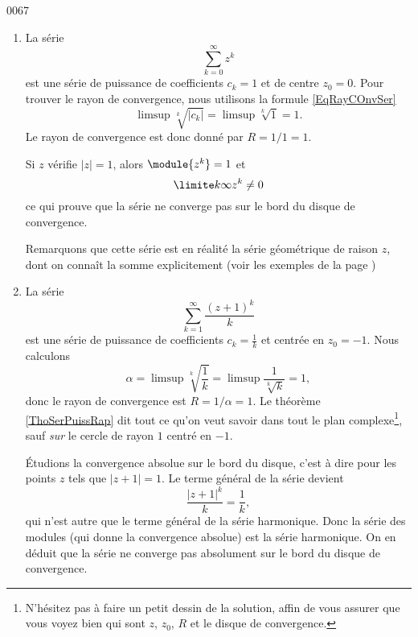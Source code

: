 
\begin{corrige}{0067}

\begin{enumerate}
\item La série
\begin{equation*}
	\sum_{k=0}^\infty z^k
\end{equation*}
est une série de puissance de coefficients $c_k = 1$ et de centre $z_0 = 0$. Pour trouver le rayon de convergence, nous utilisons la formule \eqref{EqRayCOnvSer}
\begin{equation*}
	\limsup\sqrt[k]{| c_k |}=\limsup\sqrt[k]{1}=1.
\end{equation*}
Le rayon de convergence est donc donné par $R = 1/1 = 1$.

Si $z$ vérifie $| z | = 1$, alors $\module{z^k} = 1$ et
\begin{equation*}
	\limite k \infty z^k \neq 0
\end{equation*}
ce qui prouve que la série ne converge pas sur le bord du disque de
convergence.

Remarquons que cette série est en réalité la série géométrique de raison $z$, dont on connaît la somme explicitement (voir les exemples de la page \pageref{exemples:series})

\item La série
\begin{equation*}
	\sum_{k=1}^\infty \frac{{(z+1)}^k}{k}
\end{equation*}
est une série de puissance de coefficients $c_k = \frac{1}{ k }$ et centrée en $z_0 = -1$. Nous calculons
\begin{equation}
	\alpha=\limsup\sqrt[k]{\frac{1}{ k }}=\limsup\frac{1}{ \sqrt[k]{k} }=1,
\end{equation}
donc le rayon de convergence est $R = 1/\alpha = 1$. Le théorème \ref{ThoSerPuissRap} dit tout ce qu'on veut savoir dans tout le plan complexe\footnote{N'hésitez pas à faire un petit dessin de la solution, affin de vous assurer que vous voyez bien qui sont $z$, $z_0$, $R$ et le disque de convergence.}, sauf \emph{sur} le cercle de rayon $1$ centré en $-1$.


Étudions la convergence absolue sur le bord du disque, c'est à dire pour les points $z$ tels que $| z+1 |=1$. Le terme général de la série devient
\begin{equation}
	\frac{ | z+1 |^k }{ k }=\frac{ 1 }{ k },
\end{equation}
qui n'est autre que le terme général de la série harmonique. Donc la série des modules (qui donne la convergence absolue) est la série harmonique. On en déduit que la série ne converge pas absolument sur le bord du disque de convergence.


\end{enumerate}
\end{corrige}

